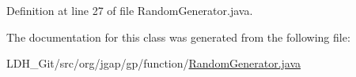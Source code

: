 Definition at line 27 of file Random\-Generator.\-java.



The documentation for this class was generated from the following file\-:\begin{DoxyCompactItemize}
\item 
L\-D\-H\-\_\-\-Git/src/org/jgap/gp/function/\hyperlink{gp_2function_2_random_generator_8java}{Random\-Generator.\-java}\end{DoxyCompactItemize}
